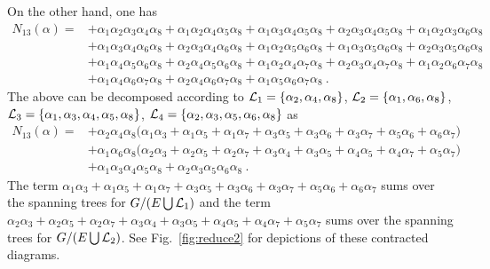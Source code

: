 \documentclass[a4paper,11pt]{article}
\begin{document}
On the other hand, one has 
\begin{align}
N_{13}(\alpha)=&+\alpha _1 \alpha _2 \alpha _3 \alpha _4 \alpha _8+\alpha _1 \alpha _2 \alpha _4 \alpha _5 \alpha _8+\alpha _1 \alpha _3 \alpha _4 \alpha _5 \alpha _8+\alpha _2 \alpha _3 \alpha _4 \alpha _5 \alpha _8+\alpha _1 \alpha _2 \alpha _3 \alpha _6 \alpha _8\nonumber \\ & +\alpha _1 \alpha _3 \alpha _4 \alpha _6 \alpha _8+\alpha _2 \alpha _3 \alpha _4 \alpha _6 \alpha _8+\alpha _1 \alpha _2 \alpha _5 \alpha _6 \alpha _8+\alpha _1 \alpha _3 \alpha _5 \alpha _6 \alpha _8+\alpha _2 \alpha _3 \alpha _5 \alpha _6 \alpha _8\nonumber \\ 
&+\alpha _1 \alpha _4 \alpha _5 \alpha _6 \alpha _8+\alpha _2 \alpha _4 \alpha _5 \alpha _6 \alpha _8+\alpha _1 \alpha _2 \alpha _4 \alpha _7 \alpha _8+\alpha _2 \alpha _3 \alpha _4 \alpha _7 \alpha _8+\alpha _1 \alpha _2 \alpha _6 \alpha _7 \alpha _8\nonumber \\ 
&+\alpha _1 \alpha _4 \alpha _6 \alpha _7 \alpha _8+\alpha _2 \alpha _4 \alpha _6 \alpha _7 \alpha _8+\alpha _1 \alpha _5 \alpha _6 \alpha _7 \alpha _8 \ .
\end{align}
The above can be decomposed according to ${\cal L}_1=\{\alpha_2,\alpha_4,\alpha_8\}$, ${\cal L}_2=\{\alpha_1,\alpha_6,\alpha_8\}$, ${\cal L}_3=\{\alpha_1,\alpha_3,\alpha_4,\alpha_5,\alpha_8\}$, ${\cal L}_4=\{\alpha_2,\alpha_3,\alpha_5,\alpha_6,\alpha_8\}$ as
\begin{align}
N_{13}(\alpha)=&+\alpha_2\alpha_4\alpha_8 \bigg(\alpha_1\alpha_3+\alpha_1\alpha_5+\alpha_1\alpha_7+\alpha_3\alpha_5+\alpha_3\alpha_6+\alpha_3\alpha_7+\alpha_5\alpha_6+\alpha_6\alpha_7\bigg)\nonumber \\ 
&+\alpha_1\alpha_6\alpha_8 \bigg(\alpha_2\alpha_3+\alpha_2\alpha_5+\alpha_2\alpha_7+\alpha_3\alpha_4+\alpha_3\alpha_5+\alpha_4\alpha_5+\alpha_4\alpha_7+\alpha_5\alpha_7\bigg) \nonumber \\ 
&+\alpha_1\alpha_3\alpha_4\alpha_5\alpha_8+\alpha_2\alpha_3\alpha_5\alpha_6\alpha_8 \ .
\end{align}
The term $\alpha_1\alpha_3+\alpha_1\alpha_5+\alpha_1\alpha_7+\alpha_3\alpha_5+\alpha_3\alpha_6+\alpha_3\alpha_7+\alpha_5\alpha_6+\alpha_6\alpha_7$ sums over the spanning trees for $G/(E\bigcup{\cal L}_1)$ and the term $\alpha_2\alpha_3+\alpha_2\alpha_5+\alpha_2\alpha_7+\alpha_3\alpha_4+\alpha_3\alpha_5+\alpha_4\alpha_5+\alpha_4\alpha_7+\alpha_5\alpha_7$ sums over the spanning trees for $G/(E\bigcup {\cal L}_2)$. See Fig.~\ref{fig:reduce2} for depictions of these contracted diagrams. 
\end{document}
